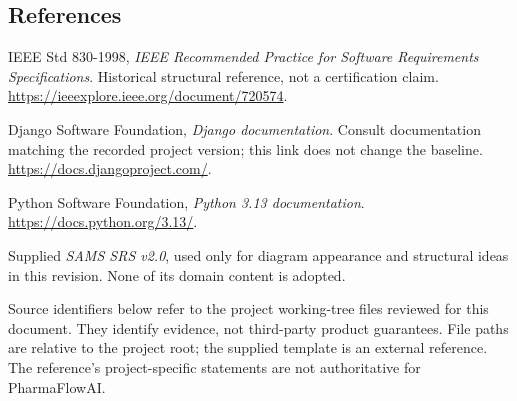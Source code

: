 \documentclass[11pt,a4paper]{article}
\newcommand{\Project}{PharmaFlowAI}
\begin{document}
\subsection{References}\label{sec:references}
\begin{description}[style=nextline,leftmargin=12mm]
\item[R01] IEEE Std 830-1998, \emph{IEEE Recommended Practice for Software Requirements Specifications}. Historical structural reference, not a certification claim. \url{https://ieeexplore.ieee.org/document/720574}.
\item[R02] Django Software Foundation, \emph{Django documentation}. Consult documentation matching the recorded project version; this link does not change the baseline. \url{https://docs.djangoproject.com/}.
\item[R03] Python Software Foundation, \emph{Python 3.13 documentation}. \url{https://docs.python.org/3.13/}.
\item[R04] Supplied \emph{SAMS SRS v2.0}, used only for diagram appearance and structural ideas in this revision. None of its domain content is adopted.
\end{description}
Source identifiers below refer to the project working-tree files reviewed for this document. They identify evidence, not third-party product guarantees. File paths are relative to the project root; the supplied template is an external reference. The reference's project-specific statements are not authoritative for \Project.
\end{document}
